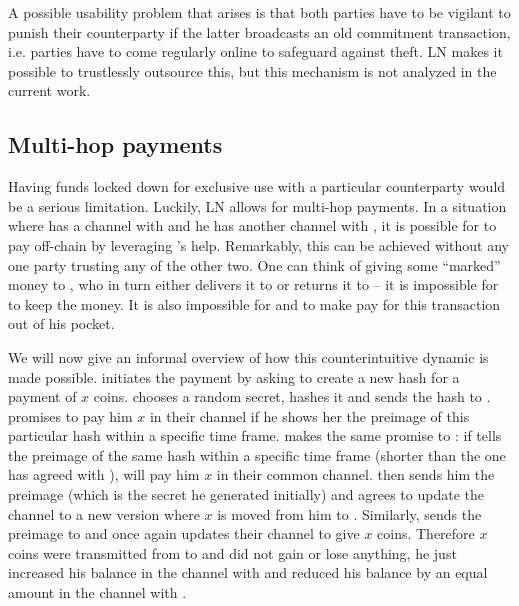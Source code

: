     A possible usability problem that arises is that both parties have to be
    vigilant to punish their counterparty if the latter broadcasts an old
    commitment transaction, i.e. parties have to come regularly online to
    safeguard against theft. LN makes it possible to trustlessly outsource this,
    but this mechanism is not analyzed in the current work.

  \subsection{Multi-hop payments}
    Having funds locked down for exclusive use with a particular counterparty
    would be a serious limitation. Luckily, LN allows for multi-hop payments. In
    a situation where \alice{} has a channel with \bob{} and he has another
    channel with \charlie{}, it is possible for \alice{} to pay \charlie{}
    off-chain by leveraging \bob's help. Remarkably, this can be achieved
    without any one party trusting any of the other two. One can think of
    \alice{} giving some ``marked'' money to \bob{}, who in turn either delivers
    it to \charlie{} or returns it to \alice{} -- it is impossible for \bob{} to
    keep the money. It is also impossible for \alice{} and \charlie{} to make
    \bob{} pay for this transaction out of his pocket.

    We will now give an informal overview of how this counterintuitive dynamic
    is made possible. \alice{} initiates the payment by asking \charlie{} to
    create a new hash for a payment of $x$ coins. \charlie{} chooses a random
    secret, hashes it and sends the hash to \alice. \alice{} promises \bob{} to
    pay him $x$ in their channel if he shows her the preimage of this particular
    hash within a specific time frame. \bob{} makes the same promise to
    \charlie{}: if \charlie{} tells \bob{} the preimage of the same hash within
    a specific time frame (shorter than the one \bob{} has agreed with
    \alice{}), \bob{} will pay him $x$ in their common channel. \charlie{} then
    sends him the preimage (which is the secret he generated initially) and
    \bob{} agrees to update the channel to a new version where $x$ is moved from
    him to \charlie. Similarly, \bob{} sends the preimage to \alice{} and once
    again \alice{} updates their channel to give \bob{} $x$ coins. Therefore $x$
    coins were transmitted from \alice{} to \charlie{} and \bob{} did not gain
    or lose anything, he just increased his balance in the channel with \alice{}
    and reduced his balance by an equal amount in the channel with \charlie.

